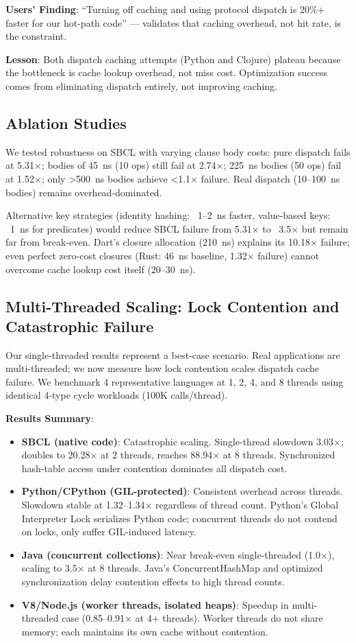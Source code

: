\documentclass[sigplan,final,acmsmall,review,screen]{acmart}
\begin{document}
\textbf{Users' Finding}: ``Turning off caching and using protocol dispatch is 20\%+ faster for our hot-path code'' — validates that caching overhead, not hit rate, is the constraint.

\textbf{Lesson}: Both dispatch caching attempts (Python and Clojure) plateau because the bottleneck is cache lookup overhead, not miss cost. Optimization success comes from eliminating dispatch entirely, not improving caching.

\subsection{Ablation Studies}
\label{sec:ablations}

We tested robustness on SBCL with varying clause body costs: pure dispatch fails at 5.31×; bodies of 45~ns (10 ops) still fail at 2.74×; 225~ns bodies (50 ops) fail at 1.52×; only >500~ns bodies achieve <1.1× failure. Real dispatch (10--100~ns bodies) remains overhead-dominated.

Alternative key strategies (identity hashing: ~1--2~ns faster, value-based keys: ~1~ns for predicates) would reduce SBCL failure from 5.31× to ~3.5× but remain far from break-even. Dart's closure allocation (210~ns) explains its 10.18× failure; even perfect zero-cost closures (Rust: 46~ns baseline, 1.32× failure) cannot overcome cache lookup cost itself (20--30~ns).

\subsection{Multi-Threaded Scaling: Lock Contention and Catastrophic Failure}
\label{sec:multi-threading}

Our single-threaded results represent a best-case scenario. Real applications are multi-threaded; we now measure how lock contention scales dispatch cache failure.
We benchmark 4 representative languages at 1, 2, 4, and 8 threads using identical 4-type cycle workloads (100K calls/thread).

\textbf{Results Summary}:
\begin{itemize}
  \item \textbf{SBCL (native code)}: Catastrophic scaling. Single-thread slowdown 3.03×; doubles to 20.28× at 2 threads, reaches 88.94× at 8 threads.
    Synchronized hash-table access under contention dominates all dispatch cost.
  \item \textbf{Python/CPython (GIL-protected)}: Consistent overhead across threads. Slowdown stable at 1.32--1.34× regardless of thread count.
    Python's Global Interpreter Lock serializes Python code; concurrent threads do not contend on locks, only suffer GIL-induced latency.
  \item \textbf{Java (concurrent collections)}: Near break-even single-threaded (1.0×), scaling to 3.5× at 8 threads.
    Java's ConcurrentHashMap and optimized synchronization delay contention effects to high thread counts.
  \item \textbf{V8/Node.js (worker threads, isolated heaps)}: Speedup in multi-threaded case (0.85--0.91× at 4+ threads).
    Worker threads do not share memory; each maintains its own cache without contention.
\end{itemize}
\end{document}
